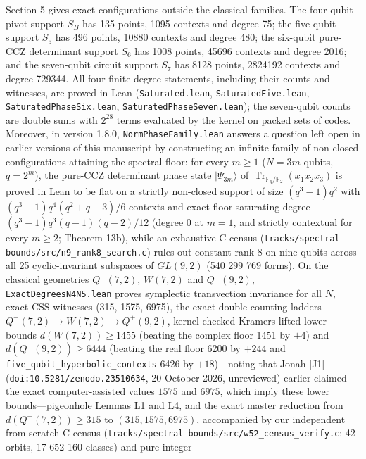 \documentclass[11pt,a4paper]{article}
\begin{document}
Section 5 gives exact configurations outside the classical families. The four-qubit pivot support
\(S_B\) has 135 points, 1095 contexts and degree 75; the five-qubit support \(S_5\) has 496 points, 10880
contexts and degree 480; the six-qubit pure-CCZ determinant support \(S_6\) has 1008 points, 45696 contexts
and degree 2016; and the seven-qubit circuit support \(S_7\) has 8128 points, 2824192 contexts and degree
729344. All four finite degree statements, including their counts and witnesses, are proved in Lean
(\texttt{Saturated.lean}, \nolinkurl{SaturatedFive.lean}, \nolinkurl{SaturatedPhaseSix.lean}, \nolinkurl{SaturatedPhaseSeven.lean}); the
seven-qubit counts are double sums with \(2^{28}\) terms evaluated by the kernel on packed sets of codes.
Moreover, in version 1.8.0, \nolinkurl{NormPhaseFamily.lean} answers a question left open in earlier versions of this manuscript by constructing an infinite family
of non-closed configurations attaining the spectral floor: for every \(m\ge1\) (\(N=3m\) qubits,
\(q=2^m\)), the pure-CCZ determinant phase state \(|\Psi_{3m}\rangle\) of \(\operatorname{Tr}_{\mathbb F_q/\mathbb F_2}(x_1x_2x_3)\)
is proved in Lean to be flat on a strictly non-closed support of size \((q^3-1)q^2\) with
\((q^3-1)q^4(q^2+q-3)/6\) contexts and exact floor-saturating degree \((q^3-1)q^3(q-1)(q-2)/12\)
(degree 0 at \(m=1\), and strictly contextual for every \(m\ge2\); Theorem 13b), while an exhaustive C census (\nolinkurl{tracks/spectral-bounds/src/n9_rank8_search.c})
rules out constant rank 8 on nine qubits across all 25 cyclic-invariant subspaces of \(GL(9,2)\)
(540 299 769 forms). On the classical geometries \(Q^-(7,2)\), \(W(7,2)\) and \(Q^+(9,2)\), \nolinkurl{ExactDegreesN4N5.lean}
proves symplectic transvection invariance for all \(N\), exact CSS witnesses (315, 1575, 6975), the exact
double-counting ladders \(Q^-(7,2)\to W(7,2)\to Q^+(9,2)\), kernel-checked Kramers-lifted lower bounds
\(d(W(7,2))\ge1455\) (beating the complex floor 1451 by \(+4\)) and \(d(Q^+(9,2))\ge6444\) (beating the real
floor 6200 by \(+244\) and \nolinkurl{five_qubit_hyperbolic_contexts} 6426 by \(+18\))---noting that Jonah {[}J1{]} (\nolinkurl{doi:10.5281/zenodo.23510634}, 20 October 2026, unreviewed) earlier claimed the exact computer-assisted values \(1575\) and \(6975\), which imply these lower bounds---pigeonhole Lemmas L1 and L4,
and the exact master reduction from \(d(Q^-(7,2))\ge315\) to \((315,1575,6975)\), accompanied by our
independent from-scratch C census (\nolinkurl{tracks/spectral-bounds/src/w52_census_verify.c}: 42 orbits, 17 652 160 classes) and pure-integer
\end{document}
